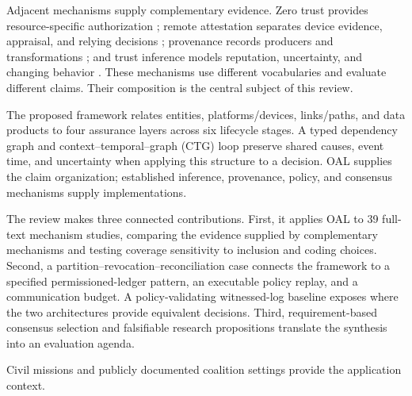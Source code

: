 Adjacent mechanisms supply complementary evidence. Zero trust provides resource-specific authorization \citep{rose2020zero,syed2022zero}; remote attestation separates device evidence, appraisal, and relying decisions \citep{birkholz2023remote}; provenance records producers and transformations \citep{w3c2013provdm,w3c2013provo}; and trust inference models reputation, uncertainty, and changing behavior \citep{ahmed2019trust,aaqib2023iot,jsang2016subjective}. These mechanisms use different vocabularies and evaluate different claims. Their composition is the central subject of this review.

The proposed \OAL{} framework relates entities, platforms/devices, links/paths, and data products to four assurance layers across six lifecycle stages. A typed dependency graph and context--temporal--graph (CTG) loop preserve shared causes, event time, and uncertainty when applying this structure to a decision. OAL supplies the claim organization; established inference, provenance, policy, and consensus mechanisms supply implementations.

The review makes three connected contributions. First, it applies OAL to 39 full-text mechanism studies, comparing the evidence supplied by complementary mechanisms and testing coverage sensitivity to inclusion and coding choices. Second, a partition--revocation--reconciliation case connects the framework to a specified permissioned-ledger pattern, an executable policy replay, and a communication budget. A policy-validating witnessed-log baseline exposes where the two architectures provide equivalent decisions. Third, requirement-based consensus selection and falsifiable research propositions translate the synthesis into an evaluation agenda.

Civil missions and publicly documented coalition settings provide the application context.
